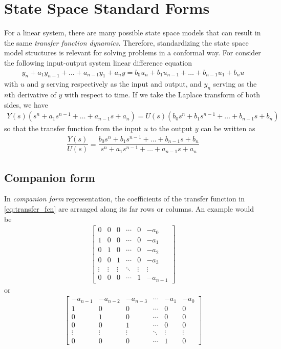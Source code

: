 \section{State Space Standard Forms}
For a linear system, there are many possible state space models that can result in the same \textit{transfer function dynamics}. Therefore, standardizing the state space model structures is 
relevant for solving problems in a conformal way. For consider the following input-output system linear difference equation
%
\begin{align}
	y_n + a_1 y_{n-1}  + \ldots + a_{n-1} y_1 + a_n y = b_0 u_n + b_1 u_{n-1} + \ldots + b_{n-1} u_1 + b_n u
\end{align}
%
with $u$ and $y$ serving respectively as the input and output, and $y_n$ serving as the $n$th derivative of $y$ with respect to time. If we take the Laplace transform of both sides, we have
%
\begin{align}
	Y(s) \left(s^n + a_1s^{n-1}+\ldots + a_{n-1}s + a_n\right) = U(s)\left(b_0 s^n + b_1 s^{n-1} + \ldots + b_{n-1} s + b_n\right)
\end{align}
%
so that the transfer function from the input $u$ to the output $y$ can be written as 
%
\begin{align}
	\dfrac{Y(s)}{U(s)} = \dfrac{b_0 s^n + b_1 s^{n-1} + \ldots + b_{n-1} s + b_n}{s^n + a_1s^{n-1}+\ldots + a_{n-1}s + a_n}
	\label{eq:transfer_fcn}
\end{align}

\subsection{Companion form}

In \textit{companion form} representation, the coefficients of the transfer function in \eqref{eq:transfer_fcn} are arranged along its far rows or columns. An example would be 
%
\begin{align}
	\begin{bmatrix} 0 & 0 & 0 & \cdots & 0 & -a_0 \\
	1 & 0 & 0 & \cdots & 0 & -a_1 \\
	0 & 1 & 0 & \cdots & 0 & -a_2 \\
	0 & 0 & 1 & \cdots & 0 & -a_3 \\
	\vdots & \vdots & \vdots &\ddots & \vdots & \vdots \\
	0 & 0 & 0 & \cdots & 1 & -a_{n-1} 
	\end{bmatrix}
\end{align}
%
or
%
\begin{align}
	\begin{bmatrix} -a_{n-1} & -a_{n-2} & -a_{n-3} & \cdots & -a_1 & -a_0 \\
	1 & 0 & 0 & \cdots & 0 & 0 \\
	0 & 1 & 0 & \cdots & 0 & 0 \\
	0 & 0 & 1 & \cdots & 0 & 0 \\
	\vdots & \vdots & \vdots &\ddots & \vdots & \vdots \\
	0 & 0 & 0 & \cdots & 1 & 0 
	\end{bmatrix}
\end{align}


